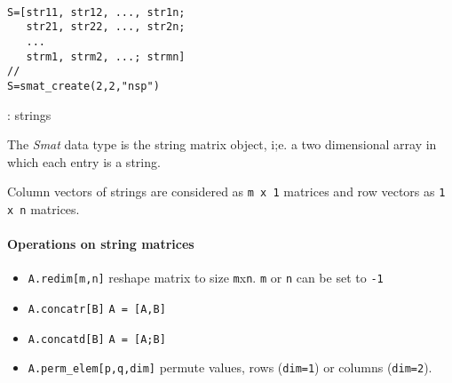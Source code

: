 
\begin{mandesc}
   \\
\end{mandesc}
\begin{calling_sequence}
\begin{verbatim}
S=[str11, str12, ..., str1n;
   str21, str22, ..., str2n;
   ...
   strm1, strm2, ...; strmn] 
// 
S=smat_create(2,2,"nsp")
\end{verbatim}
\end{calling_sequence}
\begin{parameters}
  \begin{varlist}
    : strings
  \end{varlist}
\end{parameters}

\begin{mandescription}
The \emph{Smat} data type is the string matrix  object, i;e. a
two dimensional array in which each entry is a string.

Column vectors of strings are considered as \verb!m x 1! matrices and row vectors
as \verb!1 x n! matrices.


\end{mandescription}

\paragraph{Operations on string matrices}
\begin{itemize}
\item \verb+A.redim[m,n]+ reshape matrix to size \verb+m+x\verb+n+. \verb+m+ or \verb+n+ can be set to \verb+-1+ 
\item \verb+A.concatr[B]+ \verb+A = [A,B]+
\item \verb+A.concatd[B]+ \verb+A = [A;B]+
\item \verb+A.perm_elem[p,q,dim]+ permute values, rows (\verb+dim=1+) or columns (\verb+dim=2+).
\end{itemize}

